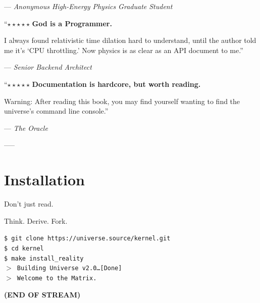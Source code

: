 \documentclass[11pt,a4paper,twoside]{book}
\begin{document}
--- \textit{Anonymous High-Energy Physics Graduate Student}

``$\star\star\star\star\star$ \textbf{God is a Programmer.}

I always found relativistic time dilation hard to understand, until the author told me it's `CPU throttling.' Now physics is as clear as an API document to me.''

--- \textit{Senior Backend Architect}

``$\star\star\star\star\star$ \textbf{Documentation is hardcore, but worth reading.}

Warning: After reading this book, you may find yourself wanting to find the universe's command line console.''

--- \textit{The Oracle}

-----

\section{Installation}

Don't just read.

Think. Derive. Fork.

\texttt{\$ git clone https://universe.source/kernel.git} \\
\texttt{\$ cd kernel} \\
\texttt{\$ make install\_reality} \\
\texttt{$>$ Building Universe v2.0\ldots [Done]} \\
\texttt{$>$ Welcome to the Matrix.}

\textbf{(END OF STREAM)}

\clearpage{}
\end{document}
